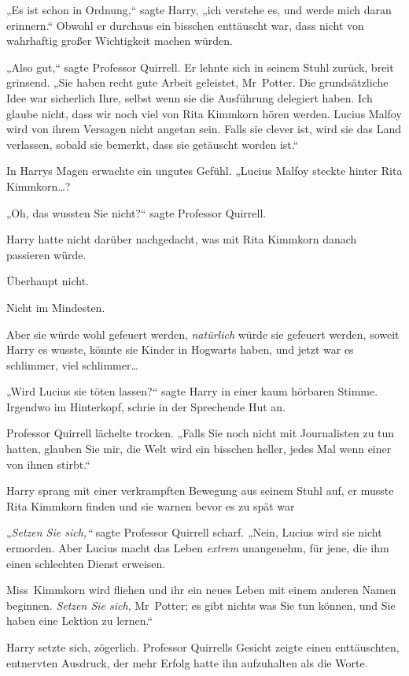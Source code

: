 {„Es ist schon in Ordnung,“ sagte Harry, „ich verstehe es, und werde mich daran erinnern.“ Obwohl er durchaus ein bisschen enttäuscht war, dass nicht von wahrhaftig großer Wichtigkeit machen würden.

„Also gut,“ sagte Professor Quirrell. Er lehnte sich in seinem Stuhl zurück, breit grinsend. „Sie haben recht gute Arbeit geleistet, Mr~Potter. Die grundsätzliche Idee war sicherlich Ihre, selbst wenn sie die Ausführung delegiert haben. Ich glaube nicht, dass wir noch viel von Rita Kimmkorn hören werden. Lucius Malfoy wird von ihrem Versagen nicht angetan sein. Falls sie clever ist, wird sie das Land verlassen, sobald sie bemerkt, dass sie getäuscht worden ist.“

In Harrys Magen erwachte ein ungutes Gefühl. „Lucius Malfoy steckte hinter Rita Kimmkorn…?

„Oh, das wussten Sie nicht?“ sagte Professor Quirrell.

Harry hatte nicht darüber nachgedacht, was mit Rita Kimmkorn danach passieren würde.

Überhaupt nicht.

Nicht im Mindesten.

Aber sie würde wohl gefeuert werden, \emph{natürlich} würde sie gefeuert werden, soweit Harry es wusste, könnte sie Kinder in Hogwarts haben, und jetzt war es schlimmer, viel schlimmer…

„Wird Lucius sie töten lassen?“ sagte Harry in einer kaum hörbaren Stimme. Irgendwo im Hinterkopf, schrie in der Sprechende Hut an.

Professor Quirrell lächelte trocken. „Falls Sie noch nicht mit Journalisten zu tun hatten, glauben Sie mir, die Welt wird ein bisschen heller, jedes Mal wenn einer von ihnen stirbt.“

Harry sprang mit einer verkrampften Bewegung aus seinem Stuhl auf, er musste Rita Kimmkorn finden und sie warnen bevor es zu spät war \later

„\emph{Setzen Sie sich,“} sagte Professor Quirrell scharf. „Nein, Lucius wird sie nicht ermorden. Aber Lucius macht das Leben \emph{extrem} unangenehm, für jene, die ihm einen schlechten Dienst erweisen.

Miss~Kimmkorn wird fliehen und ihr ein neues Leben mit einem anderen Namen beginnen. \emph{Setzen Sie sich}, Mr~Potter; es gibt nichts was Sie tun können, und Sie haben eine Lektion zu lernen.“

Harry setzte sich, zögerlich. Professor Quirrells Gesicht zeigte einen enttäuschten, entnervten Ausdruck, der mehr Erfolg hatte ihn aufzuhalten als die Worte.

}
